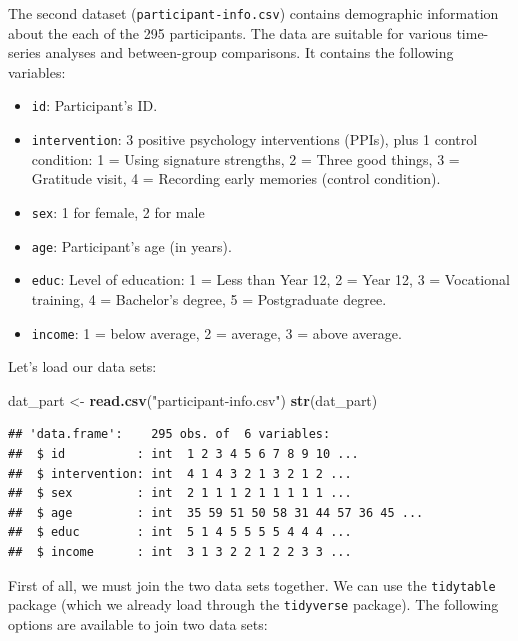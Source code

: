 \documentclass[
]{article}
\newenvironment{Shaded}{\begin{snugshade}}{\end{snugshade}}
\newcommand{\FunctionTok}[1]{\textcolor[rgb]{0.13,0.29,0.53}{\textbf{#1}}}
\newcommand{\NormalTok}[1]{#1}
\newcommand{\OtherTok}[1]{\textcolor[rgb]{0.56,0.35,0.01}{#1}}
\newcommand{\StringTok}[1]{\textcolor[rgb]{0.31,0.60,0.02}{#1}}
\providecommand{\tightlist}{%
  \setlength{\itemsep}{0pt}\setlength{\parskip}{0pt}}
\begin{document}
The second dataset (\texttt{participant-info.csv}) contains demographic
information about the each of the 295 participants. The data are
suitable for various time-series analyses and between-group comparisons.
It contains the following variables:

\begin{itemize}
\tightlist
\item
  \texttt{id}: Participant's ID.
\item
  \texttt{intervention}: 3 positive psychology interventions (PPIs),
  plus 1 control condition: 1 = Using signature strengths, 2 = Three
  good things, 3 = Gratitude visit, 4 = Recording early memories
  (control condition).
\item
  \texttt{sex}: 1 for female, 2 for male
\item
  \texttt{age}: Participant's age (in years).
\item
  \texttt{educ}: Level of education: 1 = Less than Year 12, 2 = Year 12,
  3 = Vocational training, 4 = Bachelor's degree, 5 = Postgraduate
  degree.
\item
  \texttt{income}: 1 = below average, 2 = average, 3 = above average.
\end{itemize}

Let's load our data sets:

\begin{Shaded}
\begin{Highlighting}[]
\NormalTok{dat\_part }\OtherTok{\textless{}{-}} \FunctionTok{read.csv}\NormalTok{(}\StringTok{"participant{-}info.csv"}\NormalTok{)}
\FunctionTok{str}\NormalTok{(dat\_part)}
\end{Highlighting}
\end{Shaded}

\begin{verbatim}
## 'data.frame':    295 obs. of  6 variables:
##  $ id          : int  1 2 3 4 5 6 7 8 9 10 ...
##  $ intervention: int  4 1 4 3 2 1 3 2 1 2 ...
##  $ sex         : int  2 1 1 1 2 1 1 1 1 1 ...
##  $ age         : int  35 59 51 50 58 31 44 57 36 45 ...
##  $ educ        : int  5 1 4 5 5 5 5 4 4 4 ...
##  $ income      : int  3 1 3 2 2 1 2 2 3 3 ...
\end{verbatim}

First of all, we must join the two data sets together. We can use the
\texttt{tidytable} package (which we already load through the
\texttt{tidyverse} package). The following options are available to join
two data sets:
\end{document}
